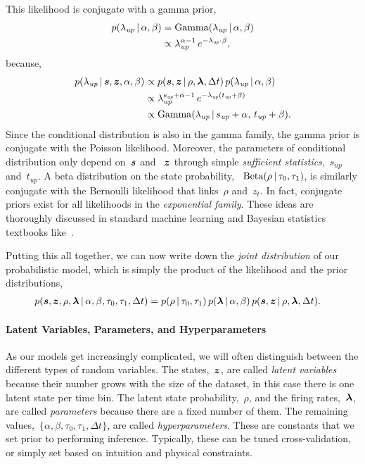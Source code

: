 This likelihood is conjugate with a gamma prior,
\begin{align}
  p(\lambda_{\textit{up}} \,|\, \alpha, \beta)
  &= \mathrm{Gamma}(\lambda_{\textit{up}} \,|\, \alpha, \beta) \\
  &\propto \lambda_{\textit{up}}^{\alpha - 1} \,
  e^{-\lambda_{\textit{up}} \cdot \beta},
\end{align}
because,
\begin{align}
  p(\lambda_{\textit{up}} \,|\, \boldsymbol{s}, \boldsymbol{z}, \alpha, \beta)
  &\propto p(\boldsymbol{s}, \boldsymbol{z} \,|\, \rho, \boldsymbol{\lambda}, \Delta t) \,
  p(\lambda_{\textit{up}} \,|\, \alpha, \beta) \\
  &\propto \lambda_{\textit{up}}^{s_{\textit{up}} + \alpha - 1} \,
  e^{-\lambda_{\textit{up}} (t_{\textit{up}} +\beta)} \\
  &\propto \mathrm{Gamma}(\lambda_{\textit{up}} \,|\,
  s_{\textit{up}} + \alpha, \,
  t_{\textit{up}} + \beta).
\end{align}
Since the conditional distribution is also in the gamma family,
the gamma prior is conjugate with the Poisson likelihood. Moreover,
the parameters of conditional distribution only depend on~$\boldsymbol{s}$ and
~$\boldsymbol{z}$ through simple \emph{sufficient statistics},~$s_{\textit{up}}$
and~$t_{\textit{up}}$. A beta distribution on the state probability,
~${\mathrm{Beta}(\rho \,|\, \tau_0, \tau_1)}$, is similarly conjugate
with the Bernoulli likelihood that links~$\rho$ and~$z_t$. In fact,
conjugate priors exist for all likelihoods in the \emph{exponential
  family}. These ideas are thoroughly discussed in standard
machine learning and Bayesian statistics textbooks like~\citet{Murphy-2012}. 

Putting this all together, we can now write down the \emph{joint
  distribution} of our probabilistic model, which is simply the
product of the likelihood and the prior distributions,
\begin{align}
  \label{eq:full_joint}
  p(\boldsymbol{s}, \boldsymbol{z}, \rho, \boldsymbol{\lambda} \,|\, \alpha, \beta, \tau_0, \tau_1, \Delta t) 
  &= p(\rho \,|\, \tau_0, \tau_1) \, 
     p(\boldsymbol{\lambda} \,|\, \alpha, \beta) \,
     p(\boldsymbol{s}, \boldsymbol{z} \,|\, \rho, \boldsymbol{\lambda}, \Delta t).
\end{align}


\paragraph{Latent Variables, Parameters, and Hyperparameters}
As our models get increasingly complicated, 
we will often distinguish between the different types of random
variables. The states,~$\boldsymbol{z}$, are called \emph{latent
  variables} because their number grows with the size of the dataset,
in this case there is one latent state per time bin. The latent state
probability,~$\rho$, and the firing rates,~$\boldsymbol{\lambda}$, are called
\emph{parameters} because there are a fixed number of them. The
remaining values,~${\{ \alpha, \beta, \tau_0, \tau_1, \Delta t \} }$,
are called \emph{hyperparameters}. These are constants that we set
prior to performing inference.  Typically, these can be tuned
cross-validation, or simply set based on intuition and physical
constraints.

